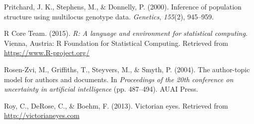 \documentclass[12pt,]{article}
\begin{document}
\hypertarget{ref-pritchard2000inference}{}
Pritchard, J. K., Stephens, M., \& Donnelly, P. (2000). Inference of
population structure using multilocus genotype data. \emph{Genetics},
\emph{155}(2), 945--959.

\hypertarget{ref-r2015}{}
R Core Team. (2015). \emph{R: A language and environment for statistical
computing}. Vienna, Austria: R Foundation for Statistical Computing.
Retrieved from \url{https://www.R-project.org/}

\hypertarget{ref-rosen2004author}{}
Rosen-Zvi, M., Griffiths, T., Steyvers, M., \& Smyth, P. (2004). The
author-topic model for authors and documents. In \emph{Proceedings of
the 20th conference on uncertainty in artificial intelligence} (pp.
487--494). AUAI Press.

\hypertarget{ref-roy2013victorian}{}
Roy, C., DeRose, C., \& Boehm, F. (2013). Victorian eyes. Retrieved from
\url{http://victorianeyes.com}
\end{document}
